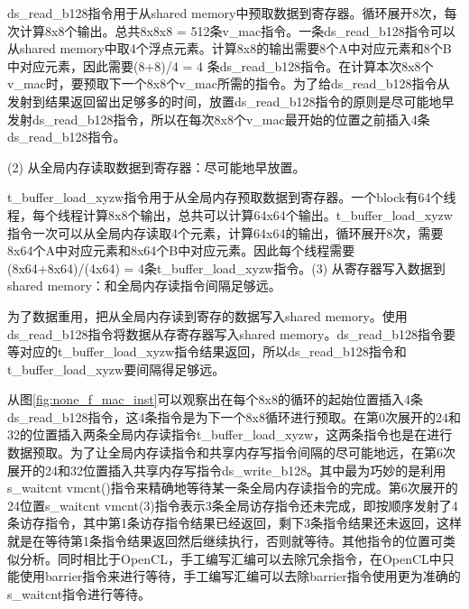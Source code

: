 ds\_read\_b128指令用于从shared memory中预取数据到寄存器。循环展开8次，每次计算8x8个输出。总共8x8x8 = 512条v\_mac指令。一条ds\_read\_b128指令可以从shared memory中取4个浮点元素。计算8x8的输出需要8个A中对应元素和8个B中对应元素，因此需要(8+8)/4 = 4 条ds\_read\_b128指令。在计算本次8x8个v\_mac时，要预取下一个8x8个v\_mac所需的指令。为了给ds\_read\_b128指令从发射到结果返回留出足够多的时间，放置ds\_read\_b128指令的原则是尽可能地早发射ds\_read\_b128指令，所以在每次8x8个v\_mac最开始的位置之前插入4条ds\_read\_b128指令。

(2) 从全局内存读取数据到寄存器：尽可能地早放置。

t\_buffer\_load\_xyzw指令用于从全局内存预取数据到寄存器。一个block有64个线程，每个线程计算8x8个输出，总共可以计算64x64个输出。t\_buffer\_load\_xyzw指令一次可以从全局内存读取4个元素，计算64x64的输出，循环展开8次，需要8x64个A中对应元素和8x64个B中对应元素。因此每个线程需要(8x64+8x64)/(4x64) = 4条t\_buffer\_load\_xyzw指令。(3) 从寄存器写入数据到shared memory：和全局内存读指令间隔足够远。

为了数据重用，把从全局内存读到寄存的数据写入shared memory。使用ds\_read\_b128指令将数据从存寄存器写入shared memory。ds\_read\_b128指令要等对应的t\_buffer\_load\_xyzw指令结果返回，所以ds\_read\_b128指令和t\_buffer\_load\_xyzw要间隔得足够远。

从图\ref{fig:none_f_mac_inst}可以观察出在每个8x8的循环的起始位置插入4条ds\_read\_b128指令，这4条指令是为下一个8x8循环进行预取。在第0次展开的24和32的位置插入两条全局内存读指令t\_buffer\_load\_xyzw，这两条指令也是在进行数据预取。为了让全局内存读指令和共享内存写指令间隔的尽可能地远，在第6次展开的24和32位置插入共享内存写指令ds\_write\_b128。其中最为巧妙的是利用s\_waitcnt vmcnt()指令来精确地等待某一条全局内存读指令的完成。第6次展开的24位置s\_waitcnt vmcnt(3)指令表示3条全局访存指令还未完成，即按顺序发射了4条访存指令，其中第1条访存指令结果已经返回，剩下3条指令结果还未返回，这样就是在等待第1条指令结果返回然后继续执行，否则就等待。其他指令的位置可类似分析。同时相比于OpenCL，手工编写汇编可以去除冗余指令，在OpenCL中只能使用barrier指令来进行等待，手工编写汇编可以去除barrier指令使用更为准确的s\_waitcnt指令进行等待。


